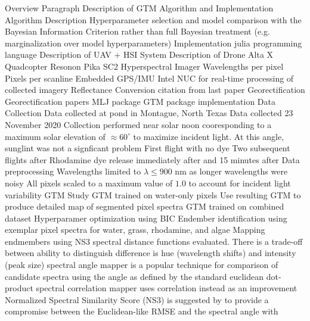 \documentclass{article}
\begin{document}
\begin{outline}[enumerate]
\1 Overview Paragraph
\1 Description of GTM Algorithm and Implementation
    \2 Algorithm  Description
    \2 Hyperparameter selection and model comparison with the Bayesian Information Criterion rather than full Bayesian treatment (e.g. marginalization over model hyperparameters)
    \2 Implementation 
        \3 julia programming language \cite{bezanson2012julia}
        \3
\1 Description of UAV + HSI System
    \2 Description of Drone
        \3 Alta X Quadcopter
        \3 Resonon Pika SC2 Hyperspectral Imager
             Wavelengths per pixel
             Pixels per scanline
            \4 Embedded GPS/IMU
        \3 Intel NUC for real-time processing of collected imagery
    \2 Reflectance Conversion 
        \3 citation from last paper
    \2 Georectification
        \3 Georectification papers \cite{muller2002program, baumker2001new, mostafa2000multi}
        \3 MLJ package \cite{blaom2020mlj}
        \3 GTM package implementation \cite{GenerativeTopographicMapping.jl}
\1 Data Collection
    \2 Data collected at pond in Montague, North Texas
        \3 Data collected 23 November 2020
        \3 Collection performed near solar noon cooresponding to a maximum solar elevation of $\approx 60^\circ$ to maximize incident light. At this angle, sunglint was not a signficant problem
        \3 First flight with no dye
        \3 Two subsequent flights after Rhodamine dye release immediately after and 15 minutes after
    \2 Data preprocessing
        \3 Wavelengths limited to $\lambda \leq 900$ nm as longer wavelengths were noisy
        \3 All pixels scaled to a maximum value of $1.0$ to account for incident light variability
\1 GTM Study
    \2 GTM trained on water-only pixels    
        \3 Use resulting GTM to produce detailed map of segmented pixel spectra
    \2 GTM trained on combined dataset
        \3 Hyperparamer optimization using BIC
        \3 Endember identification using exemplar pixel spectra for water, grass, rhodamine, and algae
        \3 Mapping endmembers using NS3 
            \4 spectral distance functions evaluated. There is a trade-off between ability to distinguish difference is hue (wavelength shifts) and intensity (peak size)\cite{deborah2015comprehensive}
            \4 spectral angle mapper is a popular technique for comparison of candidate spectra using the angle as defined by the standard euclidean dot-product
            \4 spectral correlation mapper uses correlation instead as an improvement \cite{de2000spectral}
            \4 Normalized Spectral Similarity Score (NS3) is suggested by \cite{nidamanuri2010normalized} to provide a compromise between the Euclidean-like RMSE and the spectral angle with 

\end{outline}
\end{document}
